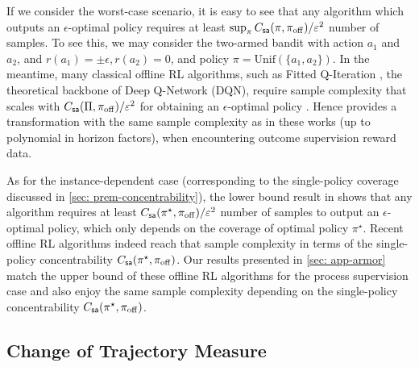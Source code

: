 \documentclass{article}
\begin{document}
If we consider the worst-case scenario, it is easy to see that any algorithm which outputs an $\epsilon$-optimal policy requires at least $\sup_{\pi} C_{\mathsf{sa}}(\pi, \pi_{\mathrm{off}}) / \varepsilon^2$ number of samples. To see this, we may consider the two-armed bandit with action $a_1$ and $a_2$, and $r(a_1) = \pm\epsilon, r(a_2) = 0$, and policy $\pi = \mathrm{Unif}(\{a_1, a_2\})$. In the meantime, many classical offline RL algorithms, such as Fitted Q-Iteration \citep{antos2008learning,munos2008finite}, the theoretical backbone of Deep Q-Network (DQN), require sample complexity that scales with $C_{\mathsf{sa}}(\Pi, \pi_{\mathrm{off}})/\varepsilon^2$ for obtaining an $\epsilon$-optimal policy \citep{chen2019information,xie2020q}. Hence  provides a transformation with the same sample complexity as in these works (up to polynomial in horizon factors), when encountering outcome supervision reward data.

As for the instance-dependent case (corresponding to the single-policy coverage discussed in \cref{sec: prem-concentrability}), the lower bound result in \citet{xie2021policy} shows that any algorithm requires at least $C_{\mathsf{sa}}(\pi^\star, \pi_{\mathrm{off}}) / \varepsilon^2$ number of samples to output an $\epsilon$-optimal policy, which only depends on the coverage of optimal policy $\pi^\star$. Recent offline RL algorithms \citep{xie2021bellman,cheng2022adversarially,uehara2021pessimistic,bhardwaj2023adversarial} indeed reach that sample complexity in terms of the single-policy concentrability $C_{\mathsf{sa}}(\pi^\star, \pi_{\mathrm{off}})$. Our results presented in \cref{sec: app-armor} match the upper bound of these offline RL algorithms for the process supervision case and also enjoy the same sample complexity depending on the single-policy concentrability $C_{\mathsf{sa}}(\pi^\star, \pi_{\mathrm{off}})$.









\subsection{Change of Trajectory Measure}
\end{document}
